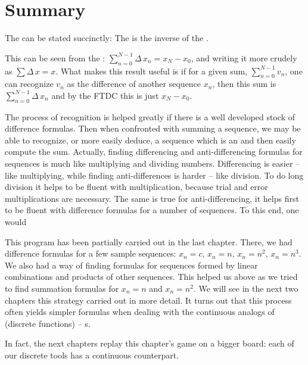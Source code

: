 \section{Summary}
The {\it {}\/} can be stated succinctly:  
The {\it {}\/} is the 
inverse of the {\it {}\/}. 

This can be seen from the :
$\sum_{n=0}^{N-1} \Delta\, x_n = x_N - x_0$, and writing it more crudely as $\sum \Delta\, x = x$. What makes 
this result useful is if for a given sum, $\sum_{n=0}^{N-1} v_n$, one can recognize $v_n$ as the difference of 
another sequence $x_n$, then this sum is $\sum_{n=0}^{N-1} \Delta\, x_n$ and by the FTDC this is just $x_N - x_0$.

The process of recognition is helped greatly if there is a well developed stock of difference formulas. Then
when confronted with summing a sequence, we may be able to recognize, or more easily deduce, a sequence which
is an {\it {}\/} and then easily compute the sum. Actually, finding differencing and 
anti-differencing formulas for sequences is much like multiplying and dividing numbers. 
Differencing is easier -- like multiplying, while finding anti-differences is harder -- like division. To 
do long division it helps to be fluent with multiplication, because trial and error multiplications are
necessary. The same is true for anti-differencing, it helps first to be fluent with difference formulas for
a number of sequences. To this end, one would
\beginEnum
{}
\endEnum

This program has been partially carried out in the last chapter. There, we had difference 
formulas for a few sample sequences:
$x_n = c$, $x_n = n$, $x_n = n^2$, $x_n = n^3$. We also had a way of finding 
formulas for sequences formed by linear combinations and 
products of other sequences. 
This helped us above as we tried to find summation formulas for $x_n = n$ and $x_n = n^2$.
We will see in the next two chapters this strategy carried out in more detail. It turns out that
this process often yields simpler formulas when dealing with the continuous analogs of
 (discrete functions) -- s.

In fact, the next chapters replay this chapter's game on a bigger board: each
of our discrete tools has a continuous counterpart.
\bigskip
\centerline{\vbox{}}
\bigskip


